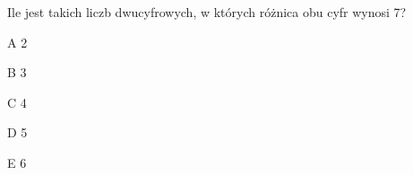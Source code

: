 \begin{tresc}
Ile jest takich liczb dwucyfrowych, w których różnica obu cyfr wynosi 7?
\end{tresc}
\begin{wariant}{A} 2 \end{wariant}
\begin{wariant}{B} 3 \end{wariant}
\begin{wariant}{C} 4 \end{wariant}
\begin{wariant}{D} 5 \end{wariant}
\begin{wariant}{E} 6 \end{wariant}
